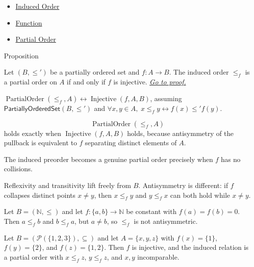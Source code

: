 \begin{dependencies}
\begin{itemize}
  \item \hyperref[def:induced-order]{Induced Order}
  \item \hyperref[def:function]{Function}
  \item \hyperref[def:partial-order]{Partial Order}
\end{itemize}
\end{dependencies}

\begin{propositionbox}{Proposition}
\begin{proposition}\label{prop:induced-poset}
Let $(B, \leq')$ be a partially ordered set and $f : A \to B$.
The induced order $\leq_f$ is a partial order on $A$ if and only if
$f$ is injective.
\hyperref[prf:induced-poset]{\textit{Go to proof.}}
\end{proposition}
\end{propositionbox}

\begin{remark*}
$\operatorname{PartialOrder}(\leq_f,A)\leftrightarrow
\operatorname{Injective}(f,A,B)$, assuming
$\mathsf{PartiallyOrderedSet}(B,\leq')$ and
$\forall x,y\in A,\; x\leq_f y\leftrightarrow f(x)\leq' f(y)$.
\end{remark*}

\begin{remark*}
\[
  \operatorname{PartialOrder}(\leq_f,A)
\] holds exactly when
$\operatorname{Injective}(f,A,B)$ holds, because antisymmetry of the pullback
is equivalent to $f$ separating distinct elements of $A$.
\end{remark*}

\begin{remark*}[Interpretation]
The induced preorder becomes a genuine partial order precisely when $f$ has no
collisions.
\end{remark*}

\begin{remark*}[Exposition]
Reflexivity and transitivity lift freely from $B$. Antisymmetry is different:
if $f$ collapses distinct points $x\neq y$, then $x\leq_f y$ and $y\leq_f x$
can both hold while $x\neq y$.
\end{remark*}

\begin{remark*}[Exposition]
Let $B=(\mathbb{N},\leq)$ and let $f:\{a,b\}\to\mathbb{N}$ be constant with
$f(a)=f(b)=0$. Then $a\leq_f b$ and $b\leq_f a$, but $a\neq b$, so
$\leq_f$ is not antisymmetric.

Let $B=(\mathcal{P}(\{1,2,3\}),\subseteq)$ and let $A=\{x,y,z\}$ with
$f(x)=\{1\}$, $f(y)=\{2\}$, and $f(z)=\{1,2\}$. Then $f$ is injective, and
the induced relation is a partial order with $x\leq_f z$, $y\leq_f z$, and
$x,y$ incomparable.
\end{remark*}

